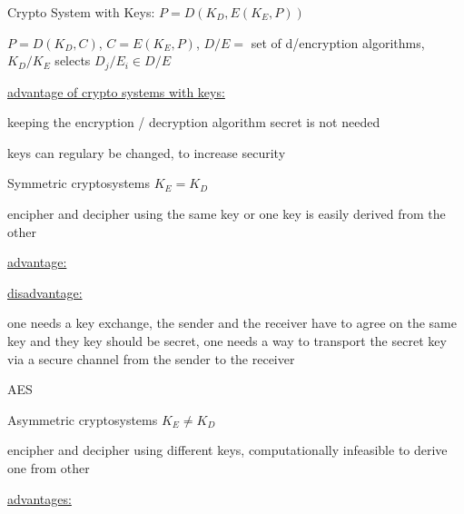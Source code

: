 \documentclass[landscape, a4paper]{article}
\begin{document}
\begin{minipage}[t]{0.198\pagewidth}
	\begin{betterlist}
		\item \alert{Crypto System with Keys:} $P = D(K_D, E(K_E, P))$
		\begin{betterlist}
			\item $P = D(K_D, C)$, $C = E(K_E, P)$, $D/E =$ set of d/encryption algorithms, $K_D/K_E$ selects $D_j/E_i \in D/E$
		\end{betterlist}
		\begin{betterlist}
			\item \underline{advantage of crypto systems with keys:}
			\begin{betterlist}
				\item keeping the encryption / decryption algorithm secret is not needed
				\item keys can regulary be changed, to increase security
			\end{betterlist}
		\end{betterlist}
	\end{betterlist}
	\begin{betterlist}
		\item \alert{Symmetric cryptosystems} $K_E = K_D$
		\begin{betterlist}
			\item encipher and decipher using the same key or one key is easily derived from the other
			\item \underline{advantage:}
			\item \underline{disadvantage:}
			\begin{betterlist}
				\item one needs a \alert{key exchange}, the sender and the receiver have to agree on the same key and they key should be secret, one needs a way to transport the secret key via a secure channel from the sender to the receiver
			\end{betterlist}
			\item \alert{AES}
		\end{betterlist}
	\end{betterlist}
	\begin{betterlist}
		\item \alert{Asymmetric cryptosystems} $K_E \ne K_D$
		\begin{betterlist}
			\item encipher and decipher using different keys, computationally infeasible to derive one from other
			\item \underline{advantages:}

\end{betterlist}
\end{betterlist}
\end{minipage}
\end{document}

